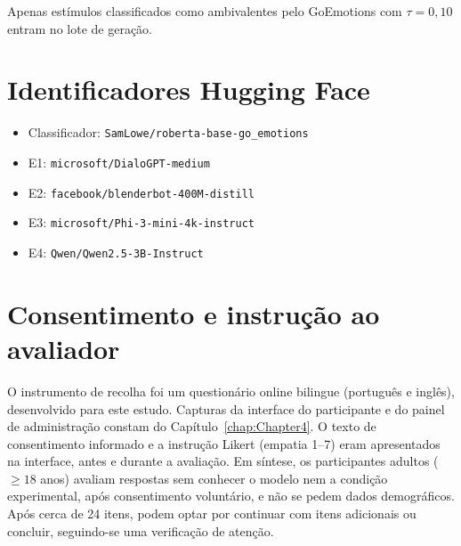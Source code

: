 Apenas estímulos classificados como ambivalentes pelo GoEmotions com \(\tau = 0{,}10\) entram no lote de geração.

\section{Identificadores Hugging Face}

\begin{itemize}
 \item Classificador: \texttt{SamLowe/roberta-base-go\_emotions}
 \item E1: \texttt{microsoft/DialoGPT-medium}
 \item E2: \texttt{facebook/blenderbot-400M-distill}
 \item E3: \texttt{microsoft/Phi-3-mini-4k-instruct}
 \item E4: \texttt{Qwen/Qwen2.5-3B-Instruct}
\end{itemize}

\section{Consentimento e instrução ao avaliador}

O instrumento de recolha foi um questionário online bilingue (português e inglês), desenvolvido para este estudo. Capturas da interface do participante e do painel de administração constam do Capítulo~\ref{chap:Chapter4}. O texto de consentimento informado e a instrução Likert (empatia 1--7) eram apresentados na interface, antes e durante a avaliação. Em síntese, os participantes adultos (\(\ge 18\) anos) avaliam respostas sem conhecer o modelo nem a condição experimental, após consentimento voluntário, e não se pedem dados demográficos. Após cerca de 24 itens, podem optar por continuar com itens adicionais ou concluir, seguindo-se uma verificação de atenção.
